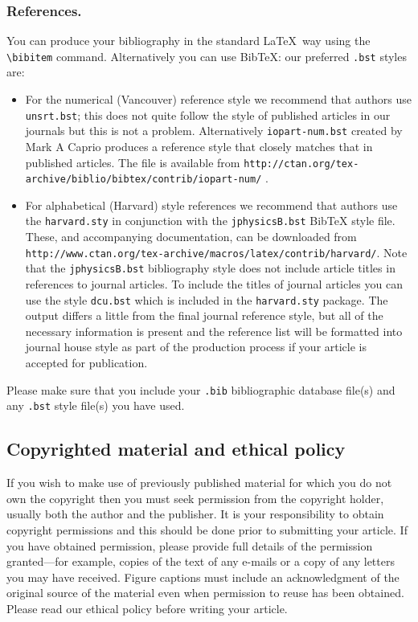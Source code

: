 \documentclass[12pt]{iopart}
\begin{document}
\subsubsection{References.\label{bibby}}
You can produce your bibliography in the standard \LaTeX\ way using the \verb"\bibitem" command. Alternatively
you can use BibTeX: our preferred  \verb".bst" styles are: 

\begin{itemize}
\item For the numerical (Vancouver) reference style we recommend that authors use 
 \verb"unsrt.bst"; this does not quite follow the style of published articles in our
 journals but this is not a problem.  Alternatively \verb"iopart-num.bst" created by Mark A Caprio
 produces a reference style that closely matches that in published articles.  The file is available from
\verb"http://ctan.org/tex-archive/biblio/bibtex/contrib/iopart-num/" .
\item For alphabetical (Harvard) style references we recommend that authors use the \verb"harvard.sty"
in conjunction with the \verb"jphysicsB.bst" BibTeX style file.  These, and accompanying documentation, can be downloaded
from  \verb"http://www.ctan.org/tex-archive/macros/latex/contrib/harvard/".
Note that the \verb"jphysicsB.bst" bibliography style does not include article titles
in references to journal articles.
To include the titles of journal articles you can use the style \verb"dcu.bst" which is included
in the \verb"harvard.sty" package.  The output differs a little from the final journal reference
style, but all of the necessary information is present and the reference list will be formatted
into journal house style as part of the production process if your article is accepted for publication.
\end{itemize}

\noindent Please make sure that you include your \verb".bib" bibliographic database file(s) and any 
\verb".bst" style file(s) you have used.

\subsection{\label{copyright}Copyrighted material and ethical policy} If you wish to make use of previously published material for which you do not own the copyright then you must seek permission from the copyright holder, usually both the author and the publisher.  It is your responsibility to obtain copyright permissions and this should be done prior to submitting your article. If you have obtained permission, please provide full details of the permission granted---for example, copies of the text of any e-mails or a copy of any letters you may have received. Figure captions must include an acknowledgment of the original source of the material even when permission to reuse has been obtained.  Please read our ethical policy before writing your article.
\end{document}
